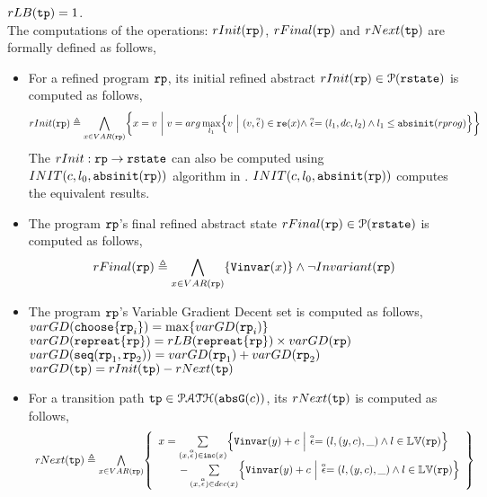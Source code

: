 $rLB(\mathtt{tp}) =  1$.
\\
The computations of the operations: $rInit(\mathtt{rp})$,
$rFinal(\mathtt{rp})$ and $rNext(\mathtt{tp})$
are formally defined as follows,
\begin{itemize}
\item For a refined program $\mathtt{rp}$, its initial refined abstract $rInit(\mathtt{rp}) \in \mathcal{P}(\mathtt{rstate})$ is computed as follows,
\[
  rInit(\rprog) \triangleq 
  \bigwedge_{x \in VAR(\rprog)}
  \left\{ 
  x = v ~\middle\vert~ 
  v = arg\max_{l_1}\left\{ 
    v~\middle\vert~ 
    (v, \absevent) \in \reset(x) 
    \land \absevent = (l_1, dc, l_2)
    \land l_1 \leq \absinit(rprog)
    \right\}
  \right\}
  \]
The $rInit : \mathtt{rp} \to \mathtt{rstate} $  can also be computed using $INIT(c, l_0, \mathtt{abs}{\mathtt{init}}(\mathtt{rp}))$ algorithm in \cite{GulwaniJK09}. 
$INIT(c, l_0, \mathtt{abs}{\mathtt{init}}(\mathtt{rp}))$ computes the equivalent results.
%
\item  The program $\mathtt{rp}$'s final refined abstract state $rFinal(\mathtt{rp}) \in \mathcal{P}(\mathtt{rstate}) $ is computed as follows, 
\[
  rFinal(\rprog) \triangleq 
  \bigwedge_{x \in VAR(\rprog)}
  \left\{ 
    \varinvar(x)
  \right\} \land \neg Invariant(\rprog)
  \]
  \item  The program $\mathtt{rp}$'s Variable Gradient Decent set is computed as follows,
\\
$varGD(\mathtt{choose}\{\mathtt{rp}_i\}) =  \max\{varGD(\mathtt{rp}_i)\}$
\\
$varGD(\mathtt{repreat}\{\mathtt{rp}\}) =  rLB(\mathtt{repreat}\{\mathtt{rp}\}) \times {varGD(\ensuremath{\mathtt{rp}})}$
\\
$varGD(\mathtt{seq}(\mathtt{rp}_1, \mathtt{rp}_2)) =  varGD(\mathtt{rp}_1)+ varGD( \mathtt{rp}_2)$
\\
$varGD(\mathtt{tp}) =  rInit(\mathtt{tp}) - rNext(\mathtt{tp})$
\\
\item  For a transition path $\mathtt{tp} \in \mathcal{PATH}(\mathtt{abs}{\mathtt{G}}(c))$, its $rNext(\mathtt{tp})$ is computed as follows,
%
\[
  \begin{array}{l}
  rNext(\tpath) \triangleq 
  \bigwedge\limits_{x \in VAR(\rprog)}
  \left\{ 
    \begin{array}{l}
  x =   \sum\limits_{(x, \absevent) \in \inc(x) }\left\{ 
    \varinvar(y) + c ~\middle\vert~ \absevent = (l, (y, c), \_) \land l \in \lvar(\rprog)\right\}
    \\ \qquad 
    - \sum\limits_{(x, \absevent) \in dec(x) }\left\{ 
      \varinvar(y) + c ~\middle\vert~ \absevent = (l, (y, c), \_) \land l \in \lvar(\rprog) \right\}
    \end{array}
  \right\}
  \end{array}
\]
\end{itemize}
%
